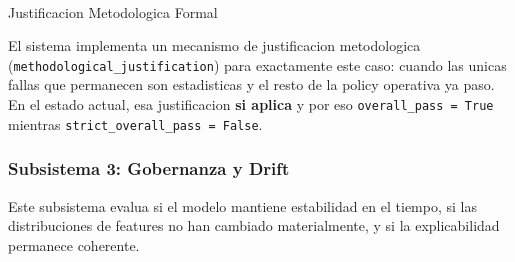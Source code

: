 \documentclass[
  spanish,
  11pt,
  letterpaper,
]{scrbook}
\makeatletter
\let\oldparagraph\paragraph
\renewcommand{\paragraph}{
    \@ifstar
      \xxxParagraphStar
      \xxxParagraphNoStar
  }
\newcommand{\xxxParagraphStar}[1]{\oldparagraph*{#1}\mbox{}}
\newcommand{\xxxParagraphNoStar}[1]{\oldparagraph{#1}\mbox{}}
\theoremstyle{plain}
\theoremstyle{remark}
\makeatother
\begin{document}
\paragraph{Justificacion Metodologica
Formal}\label{justificacion-metodologica-formal}

El sistema implementa un mecanismo de justificacion metodologica
(\texttt{methodological\_justification}) para exactamente este caso:
cuando las unicas fallas que permanecen son estadisticas y el resto de
la policy operativa ya paso. En el estado actual, esa justificacion
\textbf{si aplica} y por eso \texttt{overall\_pass\ =\ True} mientras
\texttt{strict\_overall\_pass\ =\ False}.

\subsubsection{Subsistema 3: Gobernanza y
Drift}\label{sec-mrm-governance-subsystem}

Este subsistema evalua si el modelo mantiene estabilidad en el tiempo,
si las distribuciones de features no han cambiado materialmente, y si la
explicabilidad permanece coherente.
\end{document}
